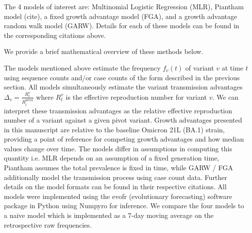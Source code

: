 \documentclass[11pt,oneside,letterpaper]{article}
\begin{document}
The 4 models of interest are: Multinomial Logistic Regression (MLR), Piantham model (cite), a fixed growth advantage model (FGA), and a growth advantage random walk model (GARW). 
Details for each of these models can be found in the corresponding citations above.

We provide a brief mathematical overview of these methods below.

The models mentioned above estimate the frequency  $f_{v}(t)$ of variant $v$ at time $t$ using sequence counts and/or case counts of the form described in the previous section.
All models simultaneously estimate the variant transmission advantages $\Delta_{v} = \frac{R_{t}^{v}}{R_{t}^{\text{pivot}}}$ where $R_{t}^{v}$ is the effective reproduction number for variant $v$.
We can interpret these transmission advantages as the relative effective reproduction number of a variant against a given pivot variant.
Growth advantages presented in this manuscript are relative to the baseline Omicron 21L (BA.1) strain, providing a point of reference for competing growth advantages and how median values change over time. 
The models differ in assumptions in computing this quantity i.e. MLR depends on an assumption of a fixed generation time, Piantham assumes the total prevalence is fixed in time, while GARW / FGA additionally model the transmission process using case count data.
Further details on the model formats can be found in their respective citations.
All models were implemented using the evofr (evolutionary forecasting) software package in Python using Numpyro for inference.
We compare the four models to a naive model which is implemented as a 7-day moving average on the retrospective raw frequencies.

%
\end{document}
